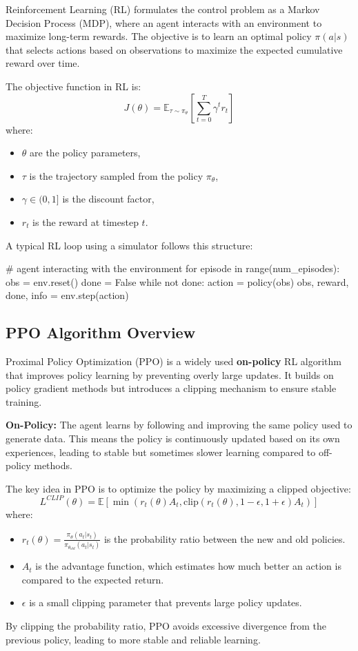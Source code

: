 Reinforcement Learning (RL) formulates the control problem as a Markov Decision Process (MDP), where an agent interacts with an environment to maximize long-term rewards. The objective is to learn an optimal policy $\pi(a | s)$ that selects actions based on observations to maximize the expected cumulative reward over time.

The objective function in RL is:
\[ J(\theta) = \mathbb{E}_{\tau \sim \pi_{\theta}} \left[ \sum_{t=0}^{T} \gamma^t r_t \right] \]
where:
\begin{itemize}
	\item $\theta$ are the policy parameters,
	\item $\tau$ is the trajectory sampled from the policy $\pi_{\theta}$,
	\item $\gamma \in (0,1]$ is the discount factor,
	\item $r_t$ is the reward at timestep $t$.
\end{itemize}

A typical RL loop using a simulator follows this structure:
\begin{pythoncode}
	# agent interacting with the environment
	for episode in range(num_episodes):
			obs = env.reset()
			done = False
			while not done:
					action = policy(obs)
					obs, reward, done, info = env.step(action)
\end{pythoncode}

\subsection{PPO Algorithm Overview}
Proximal Policy Optimization (PPO) is a widely used \textbf{on-policy} RL algorithm that improves policy learning by preventing overly large updates. It builds on policy gradient methods but introduces a clipping mechanism to ensure stable training.

\begin{highlightbox}
\textbf{On-Policy:} The agent learns by following and improving the same policy used to generate data. This means the policy is continuously updated based on its own experiences, leading to stable but sometimes slower learning compared to off-policy methods.
\end{highlightbox}

The key idea in PPO is to optimize the policy by maximizing a clipped objective:
\[ L^{CLIP}(\theta) = \mathbb{E} \left[ \min(r_t(\theta) A_t, \text{clip}(r_t(\theta), 1-\epsilon, 1+\epsilon) A_t) \right] \]
where:
\begin{itemize}
	\item $r_t(\theta) = \frac{\pi_{\theta}(a_t | s_t)}{\pi_{\theta_{old}}(a_t | s_t)}$ is the probability ratio between the new and old policies.
	\item $A_t$ is the advantage function, which estimates how much better an action is compared to the expected return.
	\item $\epsilon$ is a small clipping parameter that prevents large policy updates.
\end{itemize}

By clipping the probability ratio, PPO avoids excessive divergence from the previous policy, leading to more stable and reliable learning.
